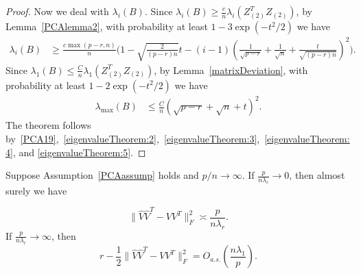 \begin{proof}
    Now we deal with $\lambda_{i}(B)$. Since $\lambda_i(B)\geq \frac{c}{n} \lambda_i(Z_{(2)}^T Z_{(2)})$, by Lemma~\ref{PCAlemma2}, with probability at least $1-3\exp(-t^2/2)$ we have
\begin{equation}\label{eigenvalueTheorem:4}
    \begin{split}
        \lambda_{i}(B)
        &\geq
        \frac{c\max(p-r,n)}{n} \Big( 1-\sqrt{\frac{2}{(p-r)n}}t-(i-1)(\frac{1}{\sqrt{p-r}}+\frac{1}{\sqrt{n}}+\frac{t}{\sqrt{(p-r)n}})^2 \Big).
    \end{split}
\end{equation}
    Since $\lambda_1(B)\leq \frac{C}{n}\lambda_1(Z_{(2)}^T Z_{(2)})$, by Lemma~\ref{matrixDeviation}, with probability at least $1-2\exp(-t^2/2)$ we have
\begin{equation}\label{eigenvalueTheorem:5}
    \begin{split}
        \lambda_{\max}(B)
        &\leq
        \frac{C}{n} (\sqrt{p-r}+\sqrt{n}+t)^2.
    \end{split}
\end{equation}
    The theorem follows by~\eqref{PCA19},~\eqref{eigenvalueTheorem:2},~\eqref{eigenvalueTheorem:3},~\eqref{eigenvalueTheorem:4}, and \eqref{eigenvalueTheorem:5}.
\end{proof}



\begin{theorem}
    Suppose Assumption~\ref{PCAassump} holds and $p/n\to \infty$.
    If  $\frac{p}{n\lambda_r}\to 0$, then almost surely we have

    \begin{equation}\label{PCAtheorem101}
        \|\hat{V}\hat{V}^T-VV^T\|^2_F\asymp\frac{p}{n\lambda_r }.
    \end{equation}
    If  $\frac{p}{n\lambda_r}\to \infty$, then
    \begin{equation}\label{PCAtheorem102}
        r-\frac{1}{2}\|\hat{V}\hat{V}^T-VV^T\|^2_F=O_{a.s.}(\frac{n\lambda_1}{p}).
    \end{equation}
\end{theorem}


